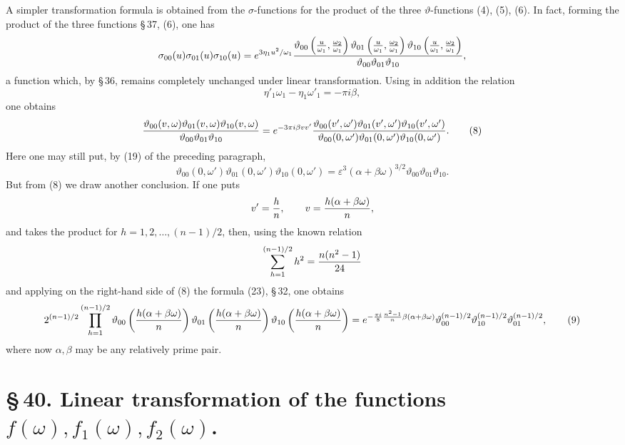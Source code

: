 \documentclass[11pt]{article}
\providecommand{\tht}{\vartheta}
\begin{document}
A simpler transformation formula is obtained from the $\sigma$-functions for the product of the three $\vartheta$-functions (4), (5), (6). In fact, forming the product of the three functions \S\,37, (6), one has
\[
{\sigma_{00}(u)\sigma_{01}(u)\sigma_{10}(u)}
=
 e^{3\eta_1u^2/\omega_1}
{\tht_{00}\left({u\over\omega_1},{\omega_2\over\omega_1}\right)
\tht_{01}\left({u\over\omega_1},{\omega_2\over\omega_1}\right)
\tht_{10}\left({u\over\omega_1},{\omega_2\over\omega_1}\right)
\over\tht_{00}\tht_{01}\tht_{10}},
\]
a function which, by \S\,36, remains completely unchanged under linear transformation. Using in addition the relation
\[
\eta'_1\omega_1-\eta_1\omega'_1=-\pi i\beta,
\]
one obtains
\begin{equation}
{\tht_{00}(v,
\omega)\tht_{01}(v,
\omega)\tht_{10}(v,
\omega)\over\tht_{00}\tht_{01}\tht_{10}}
=e^{-3\pi i\beta vv'}
{\tht_{00}(v',\omega')\tht_{01}(v',\omega')\tht_{10}(v',\omega')
\over\tht_{00}(0,
\omega')\tht_{01}(0,
\omega')\tht_{10}(0,
\omega')}.
\tag{8}
\end{equation}
Here one may still put, by (19) of the preceding paragraph,
\[
\tht_{00}(0,
\omega')\tht_{01}(0,
\omega')\tht_{10}(0,
\omega')=
\varepsilon^3(\alpha+
\beta\omega)^{3/2}\tht_{00}\tht_{01}\tht_{10}.
\]
But from (8) we draw another conclusion. If one puts
\[
v'={h\over n},
\qquad
v={h(\alpha+
\beta\omega)
\over n},
\]
and takes the product for $h=1,2,\ldots,(n-1)/2$, then, using the known relation
\[
\sum_{h=1}^{(n-1)/2}h^2={n(n^2-1)\over24}
\]
and applying on the right-hand side of (8) the formula (23), \S\,32, one obtains
\begin{equation}
2^{(n-1)/2}
\prod_{h=1}^{(n-1)/2}
\tht_{00}\left({h(\alpha+
\beta\omega)\over n}\right)
\tht_{01}\left({h(\alpha+
\beta\omega)\over n}\right)
\tht_{10}\left({h(\alpha+
\beta\omega)\over n}\right)
=e^{-\frac{\pi i}{8}{n^2-1\over n}\beta(\alpha+
\beta\omega)}
\tht_{00}^{(n-1)/2}\tht_{10}^{(n-1)/2}\tht_{01}^{(n-1)/2},
\tag{9}
\end{equation}
where now $\alpha,\beta$ may be any relatively prime pair.

\section*{\S\,40. Linear transformation of the functions $f(\omega), f_1(\omega), f_2(\omega)$.}
\end{document}
